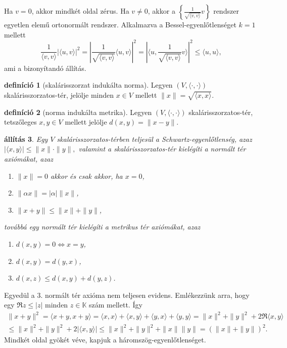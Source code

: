 \documentclass[9pt, a4paper, showtrims]{memoir}
\makeatletter
\renewenvironment{proof}[1][\proofname]
    {\par\pushQED{\qed}%
    \normalfont \topsep6\p@\@plus6\p@\relax
    \trivlist
    \item[\hskip\labelsep
        \itshape
    #1\@addpunct{:}]\ignorespaces}
    {\popQED\endtrivlist\@endpefalse}
\theoremstyle{plain}
\newtheorem{proposition}{állítás}[chapter]
\theoremstyle{remark}
\theoremstyle{definition}
\newtheorem{definition}[proposition]{definíció}
\newcommand{\ip}[2]{\langle#1,#2\rangle}
\makeatother
\begin{document}
\begin{proof}
	Ha $v=0$, akkor mindkét oldal zérus.
	Ha $v\neq 0$, akkor a $\left\{ \frac{1}{\sqrt{\ip{v}{v}}}v \right\}$ rendszer egyetlen elemű ortonormált rendszer.
	Alkalmazva a Bessel-egyenlőtlenséget $k=1$ mellett
	\[
		\frac{1}{\ip{v}{v}}
		\left|\ip{u}{v}\right|^2
		=
		\left|\frac{1}{\sqrt{\ip{v}{v}}}
		\ip{u}{v}\right|^2
		=
		\left|\ip{u}{\frac{1}{\sqrt{\ip{v}{v}}}v}\right|^2
		\leq \ip{u}{u},
	\]
	ami a bizonyítandó állítás.
\end{proof}
\begin{definition}[skalárisszorzat indukálta norma]
	Legyen $\left( V,\ip{\cdot}{\cdot} \right)$ skalárisszorzatos-tér,
	jelölje minden $x\in V$ mellett $\|x\|=\sqrt{\ip{x}{x}}$.
\end{definition}
\begin{definition}[norma indukálta metrika]
	Legyen $\left( V,\ip{\cdot}{\cdot} \right)$ skalárisszorzatos-tér,
	tetszőleges $x,y\in V$ mellett jelölje $d\left( x,y \right)=\|x-y\|$.
\end{definition}


\begin{proposition}
	Egy $V$ skalárisszorzatos-térben teljesül a \emph{Schwartz-egyenlőtlenség}, azaz
	\(|\ip{x}{y}|\leq\|x\|\cdot\|y\|,\)
	valamint a skalárisszorzatos-tér kielégíti a \emph{normált tér} axiómákat, azaz
	\begin{enumerate}
		\item $\|x\|=0$ akkor és csak akkor, ha $x=0$,
		\item $\|\alpha x\|=|\alpha|\|x\|$,
		\item $\|x+y\|\leq\|x\|+\|y\|$,
	\end{enumerate}
	továbbá egy normált tér kielégíti a \emph{metrikus tér} axiómákat, azaz
	\begin{enumerate}
		\item $d\left( x,y \right)=0\iff x=y$,
		\item $d\left( x,y \right)=d\left( y,x \right)$,
		\item $d\left( x,z \right)\leq d\left( x,y \right)+d\left( y,z \right)$.
		      \qedhere
	\end{enumerate}
\end{proposition}
\begin{proof}
	Egyedül a 3. normált tér axióma nem teljesen evidens.
	Emlékezzünk arra, hogy egy $\Re z\leq |z|$ minden $z\in\mathbb{K}$ szám mellett.
	Így
	\begin{multline*}
		\|x+y\|^2
		=
		\ip{x+y}{x+y}
		=
		\ip{x}{x}+\ip{x}{y}+\ip{y}{x}+\ip{y}{y}
		=\|x\|^2+\|y\|^2+2\Re\ip{x}{y}
		\\
		\leq
		\|x\|^2+\|y\|^2+2|\ip{x}{y}|
		\leq
		\|x\|^2+\|y\|^2+\|x\|\|y\|
		=\left( \|x\|+\|y\| \right)^2.
	\end{multline*}
	Mindkét oldal gyökét véve, kapjuk a háromszög-egyenlőtlenséget.
\end{proof}
\end{document}

